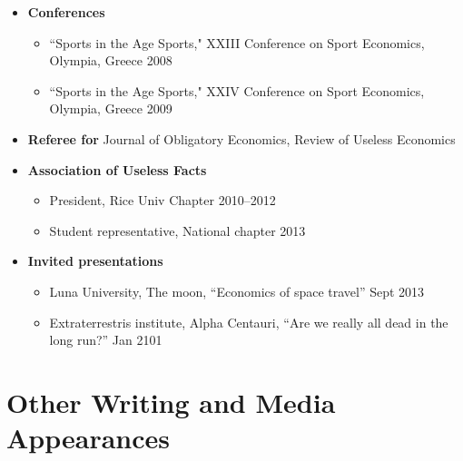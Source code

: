 \documentclass{article}[12]
\begin{document}
\begin{itemize}[itemsep=0.75em]

        \item \textbf{Conferences}
    \begin{itemize}
        \item ``Sports in the Age Sports," XXIII Conference on Sport Economics, Olympia, Greece \hfill 2008
        \item ``Sports in the Age Sports," XXIV Conference on Sport Economics, Olympia, Greece \hfill 2009
    \end{itemize}

    \item \textbf{Referee for} Journal of Obligatory Economics, Review of Useless Economics
    
    \item \textbf{Association of Useless Facts}
    \begin{itemize}
        \item President, Rice Univ Chapter \hfill 2010--2012
        \item Student representative, National chapter \hfill 2013
    \end{itemize}
    
    \item \textbf{Invited presentations}
    \begin{itemize}
        \item Luna University, The moon, ``Economics of space travel'' \hfill Sept 2013
        \item Extraterrestris institute, Alpha Centauri, ``Are we really all dead in the long run?'' \hfill Jan 2101
    \end{itemize}

\end{itemize}

\section{Other Writing and Media Appearances}
\end{document}
